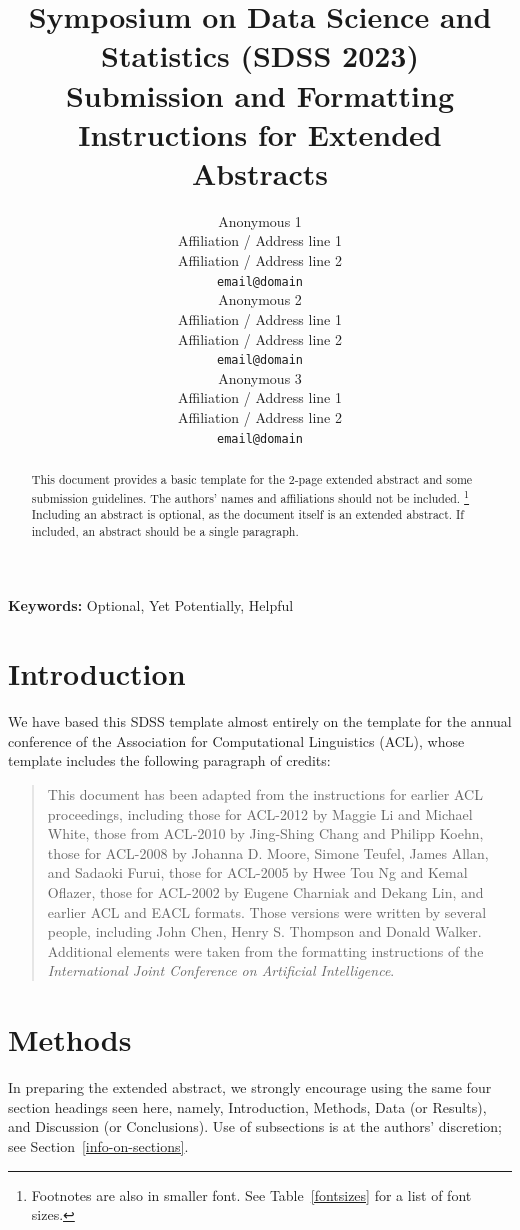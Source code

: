 \documentclass[10pt]{article}
\title{Symposium on Data Science and Statistics (SDSS 2023) \\
Submission and Formatting Instructions for Extended Abstracts}
\author{
  Anonymous 1 \\
  Affiliation / Address line 1 \\
  Affiliation / Address line 2 \\
  {\tt email@domain} \\\And
 Anonymous 2 \\
  Affiliation / Address line 1 \\
  Affiliation / Address line 2 \\
  {\tt email@domain} \\\And
  Anonymous 3 \\
  Affiliation / Address line 1 \\
  Affiliation / Address line 2 \\
  {\tt email@domain} \\}
\date{}
\begin{document}
\maketitle
\begin{abstract}
This document provides a basic template for the 2-page extended abstract
and some submission guidelines. The authors' names and affiliations should not be included. \footnote{Footnotes are also in smaller font.  
See Table~\ref{fontsizes} for a list of font sizes.}
Including an abstract is optional, as the document itself is an extended abstract.
If included, an abstract should be a single paragraph.
\end{abstract}

{\bf Keywords:} Optional, Yet Potentially, Helpful

\section{Introduction}

We have based this SDSS template almost entirely on the template for
the annual conference of the Association for Computational Linguistics (ACL), whose
template includes the following paragraph of credits:
\begin{quotation}
\small %
This document has been adapted from the instructions for earlier ACL
proceedings, including those for ACL-2012 by Maggie Li and Michael
White, those from ACL-2010 by Jing-Shing Chang and Philipp Koehn,
those for ACL-2008 by Johanna D. Moore, Simone Teufel, James Allan,
and Sadaoki Furui, those for ACL-2005 by Hwee Tou Ng and Kemal
Oflazer, those for ACL-2002 by Eugene Charniak and Dekang Lin, and
earlier ACL and EACL formats. Those versions were written by several
people, including John Chen, Henry S. Thompson and Donald
Walker. Additional elements were taken from the formatting
instructions of the {\em International Joint Conference on Artificial
  Intelligence}.
\end{quotation}  

\section{Methods}

In preparing the extended abstract, 
we strongly encourage using the same four section headings seen here, namely, 
Introduction, Methods, Data (or Results), and Discussion (or Conclusions).
Use of subsections is at the authors' discretion; see Section~\ref{info-on-sections}.
\end{document}
